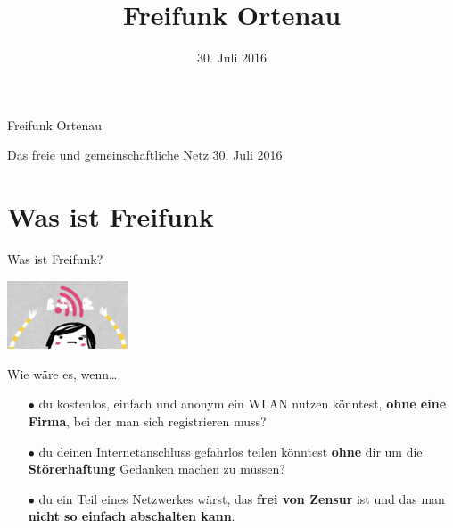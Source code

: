 \documentclass[10pt]{beamer}
\title{Freifunk Ortenau}
\author{}
\date{\footnotesize 30. Juli 2016}
\begin{document}
{
  \begin{frame}
    \begin{huge}
      Freifunk Ortenau
    \end{huge}
    \vspace{0.25em}
    \newline
    Das freie und gemeinschaftliche Netz
    \newline
    \vspace{0.5em}
    \newline
    \small{30. Juli 2016}
    \vfill
  \end{frame}
}

  \section{Was ist Freifunk}

  \begin{frame}{Was ist Freifunk?}
      \begin{center}
        \includegraphics[width=3.6cm]{images/up}
      \end{center}
      Wie wäre es, wenn\ldots
      \begin{itemize}
        \pause
        \item[\textcolor{freifunkpink}{\Large$\bullet$}] du kostenlos, einfach und anonym ein WLAN nutzen könntest, \textbf{ohne eine Firma}, bei der man sich registrieren muss?
        \pause
        \item[\textcolor{freifunkpink}{\Large$\bullet$}] du deinen Internetanschluss gefahrlos teilen könntest \textbf{ohne} dir um die \textbf{Störerhaftung} Gedanken machen zu müssen?
        \pause
        \item[\textcolor{freifunkpink}{\Large$\bullet$}] du ein Teil eines Netzwerkes wärst, das \textbf{frei von Zensur} ist und das man \textbf{nicht so einfach abschalten kann}.
      \end{itemize}
    \end{frame}
\end{document}

